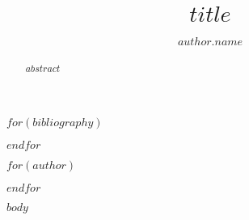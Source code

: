 


\usepackage[style=alphabetic]{biblatex}
%

$for(bibliography)$

$endfor$




\title{$title$}
  $for(author)$\author{$author.name$} $endfor$
\maketitle

\begin{abstract}
  $abstract$
\end{abstract}

\tableofcontents

\newpage

$body$

\newpage
\printbibliography[title=Bibliography]


